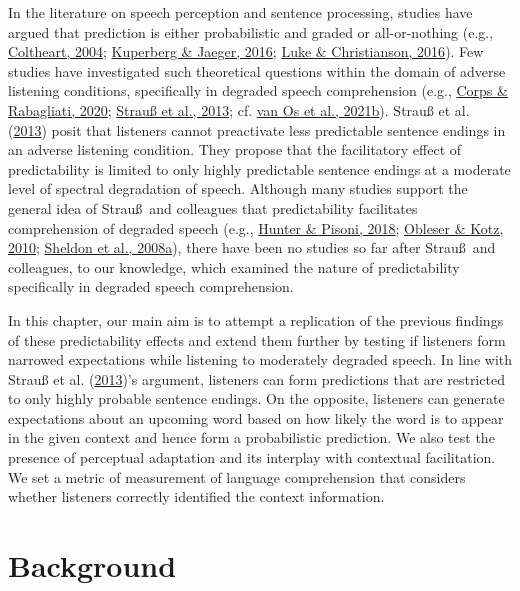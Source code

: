 \documentclass[a4paper, nobind]{templates/ociamthesis}
\begin{document}
In the literature on speech perception and sentence processing, studies have argued that prediction is either probabilistic and graded or all-or-nothing (e.g., \protect\hyperlink{ref-Coltheart2004}{Coltheart, 2004}; \protect\hyperlink{ref-Kuperberg2016}{Kuperberg \& Jaeger, 2016}; \protect\hyperlink{ref-Luke2016}{Luke \& Christianson, 2016}).
Few studies have investigated such theoretical questions within the domain of adverse listening conditions, specifically in degraded speech comprehension (e.g., \protect\hyperlink{ref-Corps2020}{Corps \& Rabagliati, 2020}; \protect\hyperlink{ref-Strauss2013}{Strauß et al., 2013}; cf. \protect\hyperlink{ref-vanOs2021}{van Os et al., 2021b}).
Strauß et al. (\protect\hyperlink{ref-Strauss2013}{2013}) posit that listeners cannot preactivate less predictable sentence endings in an adverse listening condition.
They propose that the facilitatory effect of predictability is limited to only highly predictable sentence endings at a moderate level of spectral degradation of speech.
Although many studies support the general idea of Strau\ss~and colleagues that predictability facilitates comprehension of degraded speech (e.g., \protect\hyperlink{ref-Hunter2018}{Hunter \& Pisoni, 2018}; \protect\hyperlink{ref-Obleser2010}{Obleser \& Kotz, 2010}; \protect\hyperlink{ref-Sheldon2008a}{Sheldon et al., 2008a}),
there have been no studies so far after Strau\ss~and colleagues, to our knowledge, which examined the nature of predictability specifically in degraded speech comprehension.

In this chapter, our main aim is to attempt a replication of the previous findings of these predictability effects
and extend them further by testing if listeners form narrowed expectations while listening to moderately degraded speech.
In line with Strauß et al. (\protect\hyperlink{ref-Strauss2013}{2013})'s argument, listeners can form predictions that are restricted to only highly probable sentence endings.
On the opposite, listeners can generate expectations about an upcoming word based on how likely the word is to appear in the given context
and hence form a probabilistic prediction.
We also test the presence of perceptual adaptation and its interplay with contextual facilitation.
We set a metric of measurement of language comprehension that considers whether listeners correctly identified the context information.

\hypertarget{background-1}{%
\section{Background}\label{background-1}}
\end{document}
